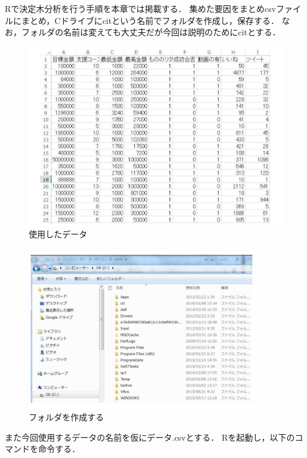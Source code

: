 Rで決定木分析を行う手順を本章では掲載する．
集めた要因をまとめcsvファイルにまとめ，Cドライブにcitという名前でフォルダを作成し，保存する．
なお，フォルダの名前は変えても大丈夫だが今回は説明のためにcitとする．

\begin{figure}[H]
\centering
\includegraphics[width=13cm]{figure18.pdf}
\caption{使用したデータ}\label{sannp}
\end{figure}


\begin{figure}[H]
\centering
\includegraphics[width=10cm]{figure20.pdf}
\caption{フォルダを作成する}\label{sannp}
\end{figure}

また今回使用するデータの名前を仮にデータ.csvとする．
Rを起動し，以下のコマンドを命令する．


